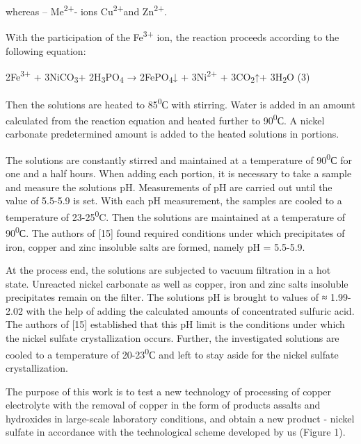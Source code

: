 whereas -- Me\textsuperscript{2+}- ions Cu\textsuperscript{2+}and
Zn\textsuperscript{2+}.

With the participation of the Fe\textsuperscript{3+} ion, the reaction
proceeds according to the following equation:

2Fe\textsuperscript{3+} + 3NiCO\textsubscript{3}+
2H\textsubscript{3}PO\textsubscript{4} → 2FePO\textsubscript{4}↓ +
3Ni\textsuperscript{2+} + 3CO\textsubscript{2}↑+ 3H\textsubscript{2}O
(3)

Then the solutions are heated to 85\textsuperscript{0}С with stirring.
Water is added in an amount calculated from the reaction equation and
heated further to 90\textsuperscript{0}С. A nickel carbonate
predetermined amount is added to the heated solutions in portions.

The solutions are constantly stirred and maintained at a temperature of
90\textsuperscript{0}С for one and a half hours. When adding each
portion, it is necessary to take a sample and measure the solutions pH.
Measurements of pH are carried out until the value of 5.5-5.9 is set.
With each pH measurement, the samples are cooled to a temperature of
23-25\textsuperscript{0}C. Then the solutions are maintained at a
temperature of 90\textsuperscript{0}С. The authors of {[}15{]} found
required conditions under which precipitates of iron, copper and zinc
insoluble salts are formed, namely pH = 5.5-5.9.

At the process end, the solutions are subjected to vacuum filtration in
a hot state. Unreacted nickel carbonate as well as copper, iron and zinc
salts insoluble precipitates remain on the filter. The solutions pH is
brought to values of ≈ 1.99-2.02 with the help of adding the calculated
amounts of concentrated sulfuric acid. The authors of {[}15{]}
established that this pH limit is the conditions under which the nickel
sulfate crystallization occurs. Further, the investigated solutions are
cooled to a temperature of 20-23\textsuperscript{0}С and left to stay
aside for the nickel sulfate crystallization.

The purpose of this work is to test a new technology of processing of
copper electrolyte with the removal of copper in the form of products
assalts and hydroxides in large-scale laboratory conditions, and obtain
a new product - nickel sulfate in accordance with the technological
scheme developed by us (Figure 1).

